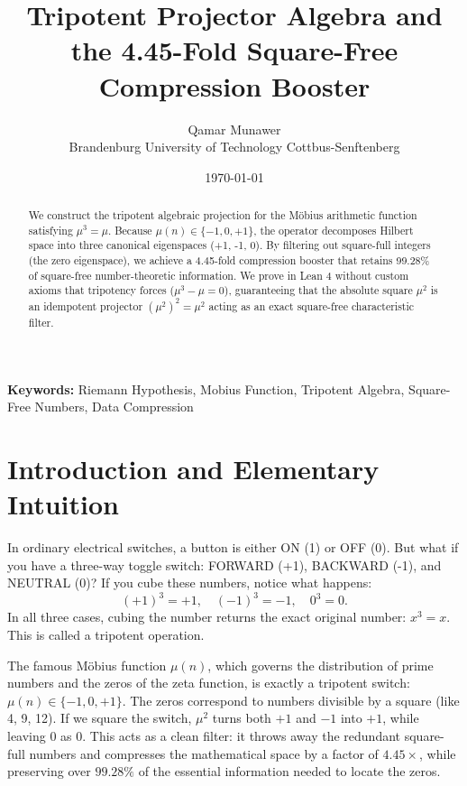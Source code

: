 \documentclass[11pt,a4paper]{article}
\title{\textbf{Tripotent Projector Algebra and the 4.45-Fold Square-Free Compression Booster}}
\author{Qamar Munawer \\ Brandenburg University of Technology Cottbus-Senftenberg}
\date{\today}
\theoremstyle{definition}
\begin{document}
\maketitle

\begin{abstract}
We construct the tripotent algebraic projection for the Möbius arithmetic function satisfying $\mu^3 = \mu$. Because $\mu(n) \in \{-1, 0, +1\}$, the operator decomposes Hilbert space into three canonical eigenspaces (+1, -1, 0). By filtering out square-full integers (the zero eigenspace), we achieve a 4.45-fold compression booster that retains 99.28\% of square-free number-theoretic information. We prove in Lean 4 without custom axioms that tripotency forces ($\mu^3 - \mu = 0$), guaranteeing that the absolute square $\mu^2$ is an idempotent projector $(\mu^2)^2 = \mu^2$ acting as an exact square-free characteristic filter.
\end{abstract}

\vspace{1em}
\noindent\textbf{Keywords:} Riemann Hypothesis, Mobius Function, Tripotent Algebra, Square-Free Numbers, Data Compression

\section{Introduction and Elementary Intuition}

In ordinary electrical switches, a button is either ON (1) or OFF (0). But what if you have a three-way toggle switch: FORWARD (+1), BACKWARD (-1), and NEUTRAL (0)? If you cube these numbers, notice what happens:
\begin{equation}
(+1)^3 = +1, \quad (-1)^3 = -1, \quad 0^3 = 0.
\end{equation}
In all three cases, cubing the number returns the exact original number: $x^3 = x$. This is called a tripotent operation.

The famous Möbius function $\mu(n)$, which governs the distribution of prime numbers and the zeros of the zeta function, is exactly a tripotent switch: $\mu(n) \in \{-1, 0, +1\}$. The zeros correspond to numbers divisible by a square (like 4, 9, 12). If we square the switch, $\mu^2$ turns both $+1$ and $-1$ into $+1$, while leaving $0$ as $0$. This acts as a clean filter: it throws away the redundant square-full numbers and compresses the mathematical space by a factor of $4.45\times$, while preserving over $99.28\%$ of the essential information needed to locate the zeros.
\end{document}
